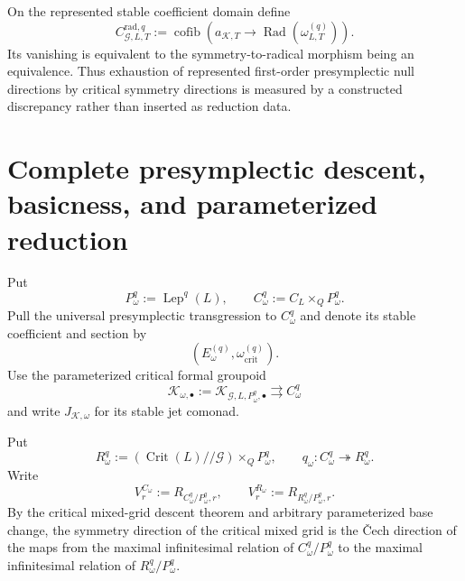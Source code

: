 \begin{definition}
\label{def:symmetry-noether-presymplectic-radical-discrepancy}
On the represented stable coefficient domain define
\[
\boxed{
C_{\mathcal G,L,T}^{\mathrm{rad},q}
:=
\operatorname{cofib}
\left(
a_{\mathcal K,T}
\longrightarrow
\operatorname{Rad}(\omega_{L,T}^{(q)})
\right).
}
\]
Its vanishing is equivalent to the symmetry-to-radical morphism being an
equivalence.  Thus exhaustion of represented first-order presymplectic null
directions by critical symmetry directions is measured by a constructed
discrepancy rather than inserted as reduction data.
\end{definition}


\section{Complete presymplectic descent, basicness, and parameterized reduction}
\label{sec:symmetry-noether-derived-presymplectic-basicness-and-parameterized-reduction}

Put
\[
P_\omega^q:=\operatorname{Lep}^q(L),
\qquad
C_\omega^q:=C_L\times_QP_\omega^q.
\]
Pull the universal presymplectic transgression to $C_\omega^q$ and denote its
stable coefficient and section by
\[
(E_\omega^{(q)},\omega_{\mathrm{crit}}^{(q)}).
\]
Use the parameterized critical formal groupoid
\[
\mathcal K_{\omega,\bullet}
:=
\mathcal K_{\mathcal G,L,P_\omega^q,\bullet}
\rightrightarrows
C_\omega^q
\]
and write $J_{\mathcal K,\omega}$ for its stable jet comonad.


Put
\[
R_\omega^q
:=
\left(\operatorname{Crit}(L)//\mathcal G\right)\times_QP_\omega^q,
\qquad
q_\omega:C_\omega^q\twoheadrightarrow R_\omega^q.
\]
Write
\[
V^{C_\omega}_r:=R_{C_\omega^q/P_\omega^q,r},
\qquad
V^{R_\omega}_r:=R_{R_\omega^q/P_\omega^q,r}.
\]
By the critical mixed-grid descent theorem and arbitrary parameterized base change,
the symmetry direction of the critical mixed grid is the \v{C}ech direction of the
maps from the maximal infinitesimal relation of $C_\omega^q/P_\omega^q$ to the
maximal infinitesimal relation of $R_\omega^q/P_\omega^q$.

